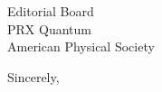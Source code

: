 \documentclass[12pt]{letter}
\begin{document}
\begin{letter}{Editorial Board\\
PRX Quantum\\
American Physical Society}
\closing{Sincerely,}

\end{letter}
\end{document}
